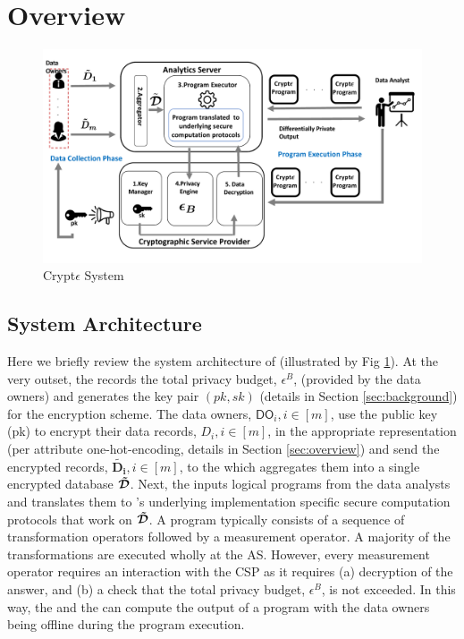 \section{\system Overview}
\begin{figure}[t]
	\includegraphics[width=0.7\columnwidth]{CryptE_Diag_New.pdf}\vspace{-5mm}
	\caption{\label{fig:system} Crypt$\epsilon$ System}%
\end{figure}

\subsection{System Architecture}
Here we briefly review the system architecture of \system (illustrated by Fig \ref{fig:system}). %
At the very outset, the %
\CSP records the total privacy budget, $\epsilon^B$, (provided by the data owners) and generates the key pair $(pk,sk)$ (details in Section \ref{sec:background}) for the encryption scheme. The data owners, ${\textsf{DO}_i, i\in [m]}$, use the public key (pk) to encrypt their data records, ${D_i, i \in [m]}$, in the appropriate representation (per attribute one-hot-encoding, details in Section \ref{sec:overview}) and send the encrypted records, $\boldsymbol{\tilde{D_i}},i \in [m]$, to the \AS
which aggregates them into a single encrypted database $\boldsymbol{\tilde{\mathcal{D}}}$. Next, the \AS inputs logical programs from the data analysts and translates them to \system's underlying implementation specific secure computation protocols that work on $\boldsymbol{\tilde{\mathcal{D}}}$.  A \system program typically consists of a sequence of transformation operators followed by a measurement operator. A majority of the transformations are executed wholly at the \textsf{AS}.%
 However, every measurement operator requires an interaction with the \textsf{CSP} as it requires (a) decryption of the answer, and (b) a check that %
the total privacy budget, $\epsilon^B$, is not exceeded. In this way, the \AS and the \CSP can compute the output of a \system program with the data owners being offline during the  program execution. 
\vspace{-0.5cm}
